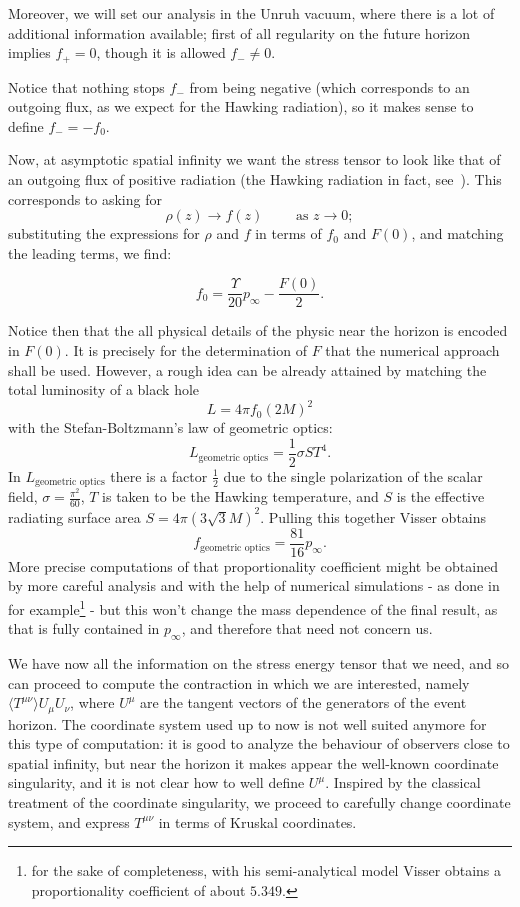 Moreover, we will set our analysis in the Unruh vacuum, where there is a lot of additional information available; first of all regularity on the future horizon implies \(f_+ = 0\), though it is allowed \(f_- \neq 0\).

Notice that nothing stops \(f_-\) from being negative (which corresponds to an outgoing flux, as we expect for the Hawking radiation), so it makes sense to define \(f_- = -f_0\). 

Now, at asymptotic spatial infinity we want the stress tensor to look like that of an outgoing flux of positive radiation (the Hawking radiation in fact, see~\cite[]{christensen1977trace}). This corresponds to asking for
\[
\rho(z) \rightarrow f(z) \quad\quad \text{ as } z \rightarrow 0;    
\]
substituting the expressions for \(\rho\) and \(f\) in terms of \(f_0\) and \(F(0)\), and matching the leading terms, we find:

\[
f_0 = \frac{\Upsilon}{20}p_{\infty} - \frac{F(0)}{2}.
\]

Notice then that the all physical details of the physic near the horizon is encoded in \(F(0)\). It is precisely for the determination of \(F\) that the numerical approach shall be used. However, a rough idea can be already attained by matching the total luminosity of a black hole
\[
    L = 4\pi f_0(2M)^2
\]
with the Stefan-Boltzmann's law of geometric optics:
\[
L_{\text{geometric optics}} = \frac{1}{2}\sigma S T^4.  
\]
In \(L_{\text{geometric optics}}\) there is a factor \(\frac{1}{2}\) due to the single polarization of the scalar field, \(\sigma = \frac{\pi^2}{60}\), \(T\) is taken to be the Hawking temperature, and \(S\) is the effective radiating surface area \(S = 4\pi(3\sqrt{3}M)^2\). Pulling this together Visser obtains
\[
 f_{\text{geometric optics}} = \frac{81}{16}p_{\infty}.
\]
More precise computations of that proportionality coefficient might be obtained by more careful analysis and with the help of numerical simulations - as done in~\cite[]{visser1997gravitational} for example\footnote{for the sake of completeness, with his semi-analytical model Visser obtains a proportionality coefficient of about \(5.349\).} - but this won't change the mass dependence of the final result, as that is fully contained in \(p_{\infty}\), and therefore that need not concern us.

We have now all the information on the stress energy tensor that we need, and so can proceed to compute the contraction in which we are interested, namely \(\langle T^{\mu\nu}\rangle U_{\mu}U_{\nu}\), where \(U^{\mu}\) are the tangent vectors of the generators of the event horizon.
The coordinate system used up to now is not well suited anymore for this type of computation: it is good to analyze the behaviour of observers close to spatial infinity, but near the horizon it makes appear the well-known coordinate singularity, and it is not clear how to well define \(U^{\mu}\). Inspired by the classical treatment of the coordinate singularity, we proceed to carefully change coordinate system, and express \(T^{\mu\nu}\) in terms of Kruskal coordinates.

